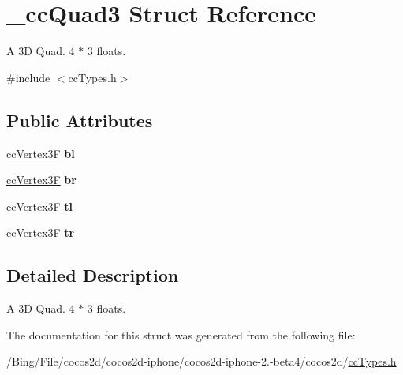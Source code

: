 \hypertarget{struct__cc_quad3}{\section{\-\_\-cc\-Quad3 Struct Reference}
\label{struct__cc_quad3}
}


A 3\-D Quad. 4 $\ast$ 3 floats.  




{\ttfamily \#include $<$cc\-Types.\-h$>$}

\subsection*{Public Attributes}
\begin{DoxyCompactItemize}
\item 
\hypertarget{struct__cc_quad3_a3d5f59cb7331ac77a9ddea620dfb9dd8}{\hyperlink{cc_types_8h_a351ac51e9885af9a15676faf8cb49f8a}{cc\-Vertex3\-F} {\bfseries bl}}\label{struct__cc_quad3_a3d5f59cb7331ac77a9ddea620dfb9dd8}

\item 
\hypertarget{struct__cc_quad3_ab9b7793ba2668672217d266f327582a7}{\hyperlink{cc_types_8h_a351ac51e9885af9a15676faf8cb49f8a}{cc\-Vertex3\-F} {\bfseries br}}\label{struct__cc_quad3_ab9b7793ba2668672217d266f327582a7}

\item 
\hypertarget{struct__cc_quad3_a136635028d20c4861fa38267d6804313}{\hyperlink{cc_types_8h_a351ac51e9885af9a15676faf8cb49f8a}{cc\-Vertex3\-F} {\bfseries tl}}\label{struct__cc_quad3_a136635028d20c4861fa38267d6804313}

\item 
\hypertarget{struct__cc_quad3_a7dfdaec27e077a7057300f453e1e3e1b}{\hyperlink{cc_types_8h_a351ac51e9885af9a15676faf8cb49f8a}{cc\-Vertex3\-F} {\bfseries tr}}\label{struct__cc_quad3_a7dfdaec27e077a7057300f453e1e3e1b}

\end{DoxyCompactItemize}


\subsection{Detailed Description}
A 3\-D Quad. 4 $\ast$ 3 floats. 

The documentation for this struct was generated from the following file\-:\begin{DoxyCompactItemize}
\item 
/\-Bing/\-File/cocos2d/cocos2d-\/iphone/cocos2d-\/iphone-\/2.-\/beta4/cocos2d/\hyperlink{cc_types_8h}{cc\-Types.\-h}\end{DoxyCompactItemize}
